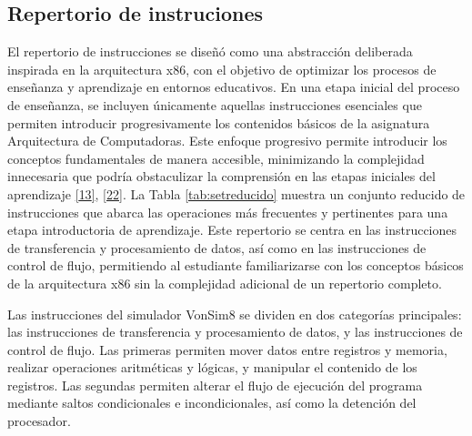 \documentclass[12pt,oneside]{templates/unerthesis}
\begin{document}
\hypertarget{repertorio-de-instruciones}{%
\subsection{Repertorio de instruciones}\label{repertorio-de-instruciones}}

El repertorio de instrucciones se diseñó como una abstracción deliberada inspirada en la arquitectura x86, con el objetivo de optimizar los procesos de enseñanza y aprendizaje en entornos educativos. En una etapa inicial del proceso de enseñanza, se incluyen únicamente aquellas instrucciones esenciales que permiten introducir progresivamente los contenidos básicos de la asignatura Arquitectura de Computadoras. Este enfoque progresivo permite introducir los conceptos fundamentales de manera accesible, minimizando la complejidad innecesaria que podría obstaculizar la comprensión en las etapas iniciales del aprendizaje \protect\hyperlink{ref-hennessy2017computer}{{[}13{]}}, \protect\hyperlink{ref-tanenbaum_structured_2016}{{[}22{]}}. La Tabla \ref{tab:setreducido} muestra un conjunto reducido de instrucciones que abarca las operaciones más frecuentes y pertinentes para una etapa introductoria de aprendizaje. Este repertorio se centra en las instrucciones de transferencia y procesamiento de datos, así como en las instrucciones de control de flujo, permitiendo al estudiante familiarizarse con los conceptos básicos de la arquitectura x86 sin la complejidad adicional de un repertorio completo.

Las instrucciones del simulador VonSim8 se dividen en dos categorías principales: las instrucciones de transferencia y procesamiento de datos, y las instrucciones de control de flujo. Las primeras permiten mover datos entre registros y memoria, realizar operaciones aritméticas y lógicas, y manipular el contenido de los registros. Las segundas permiten alterar el flujo de ejecución del programa mediante saltos condicionales e incondicionales, así como la detención del procesador.
\end{document}
